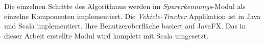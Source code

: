 Die einzelnen Schritte des Algorithmus werden im \textit{Spurerkennungs}-Modul als einzelne Komponenten
implementiert.
Die \textit{Vehicle-Tracker} Applikation ist in Java und Scala implementiert. Ihre Benutzeroberfläche basiert
auf JavaFX. Das in dieser Arbeit erstellte Modul wird komplett mit Scala umgesetzt.

